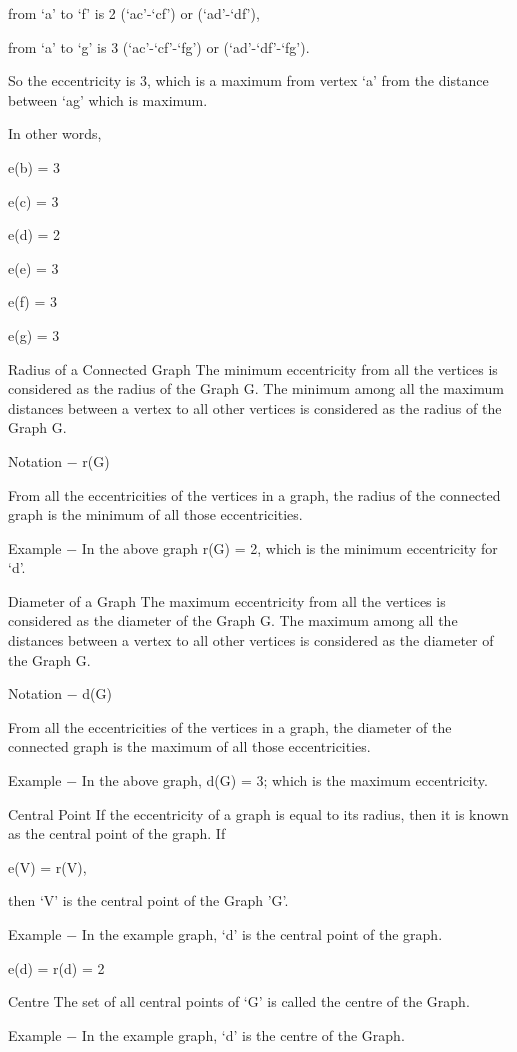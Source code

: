 from ‘a’ to ‘f’ is 2 (‘ac’-‘cf’) or (‘ad’-‘df’),

from ‘a’ to ‘g’ is 3 (‘ac’-‘cf’-‘fg’) or (‘ad’-‘df’-‘fg’).

So the eccentricity is 3, which is a maximum from vertex ‘a’ from the distance between ‘ag’ which is maximum.

In other words,

e(b) = 3

e(c) = 3

e(d) = 2

e(e) = 3

e(f) = 3

e(g) = 3

Radius of a Connected Graph
The minimum eccentricity from all the vertices is considered as the radius of the Graph G. The minimum among all the maximum distances between a vertex to all other vertices is considered as the radius of the Graph G.

Notation − r(G)

From all the eccentricities of the vertices in a graph, the radius of the connected graph is the minimum of all those eccentricities.

Example − In the above graph r(G) = 2, which is the minimum eccentricity for ‘d’.

Diameter of a Graph
The maximum eccentricity from all the vertices is considered as the diameter of the Graph G. The maximum among all the distances between a vertex to all other vertices is considered as the diameter of the Graph G.

Notation − d(G)

From all the eccentricities of the vertices in a graph, the diameter of the connected graph is the maximum of all those eccentricities.

Example − In the above graph, d(G) = 3; which is the maximum eccentricity.

Central Point
If the eccentricity of a graph is equal to its radius, then it is known as the central point of the graph. If

e(V) = r(V),

then ‘V’ is the central point of the Graph ’G’.

Example − In the example graph, ‘d’ is the central point of the graph.

e(d) = r(d) = 2

Centre
The set of all central points of ‘G’ is called the centre of the Graph.

Example − In the example graph, {‘d’} is the centre of the Graph.


